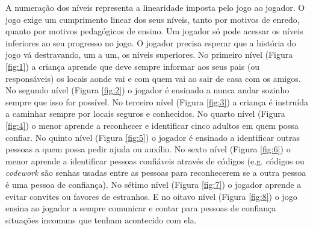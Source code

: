 A numeração dos níveis representa a linearidade imposta pelo jogo ao jogador. O jogo exige um cumprimento linear dos seus níveis, tanto por motivos de enredo, quanto por motivos pedagógicos de ensino. Um jogador só pode acessar os níveis inferiores ao seu progresso no jogo. O jogador precisa esperar que a história do jogo vá destravando, um a um, os níveis superiores. No primeiro nível (Figura \ref{fig:1}) a criança aprende que deve sempre informar aos seus pais (ou responsáveis) os locais aonde vai e com quem vai ao sair de casa com os amigos. No segundo nível (Figura \ref{fig:2}) o jogador é ensinado a nunca andar sozinho sempre que isso for possível. No terceiro nível (Figura \ref{fig:3}) a criança é instruída a caminhar sempre por locais seguros e conhecidos. No quarto nível (Figura \ref{fig:4}) o menor aprende a reconhecer e identificar cinco adultos em quem possa confiar. No quinto nível (Figura \ref{fig:5}) o jogador é ensinado a identificar outras pessoas a quem possa pedir ajuda ou auxílio. No sexto nível (Figura \ref{fig:6}) o menor aprende a identificar pessoas confiáveis através de códigos (e.g. códigos ou \textit{codework} são senhas usadas entre as pessoas para reconhecerem se a outra pessoa é uma pessoa de confiança). No sétimo nível (Figura \ref{fig:7}) o jogador aprende a evitar convites ou favores de estranhos. E no oitavo nível (Figura \ref{fig:8}) o jogo ensina ao jogador a sempre comunicar e contar para pessoas de confiança situações incomuns que tenham acontecido com ela. 





